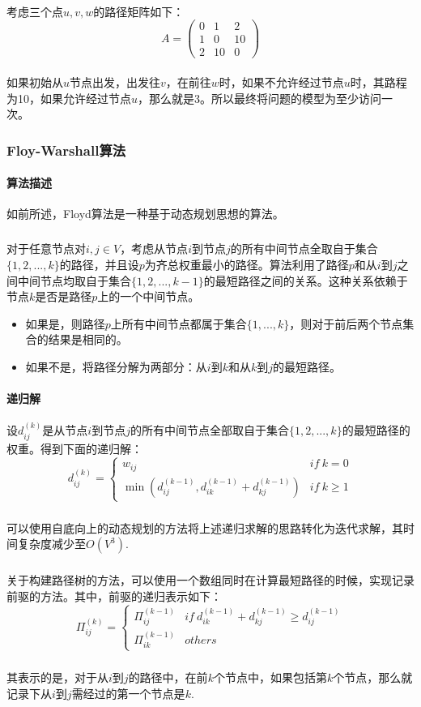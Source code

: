 \documentclass[UTF8,a4paper]{ctexart}
\begin{document}
\paragraph{}考虑三个点$u,v,w$的路径矩阵如下：
\[
    A=\begin{pmatrix}
        0 & 1  & 2  \\
        1 & 0  & 10 \\
        2 & 10 & 0
    \end{pmatrix}
\]
\paragraph{}如果初始从$u$节点出发，出发往$v$，在前往$w$时，如果不允许经过节点$u$时，其路程为10，如果允许经过节点$u$，那么就是3。所以最终将问题的模型为至少访问一次。

\subsubsection{Floy-Warshall算法}\label{sec:floydsolution}
\paragraph{算法描述}如前所述，Floyd算法是一种基于动态规划思想的算法。
\subparagraph{}对于任意节点对$i,j\in V$，考虑从节点$i$到节点$j$的所有中间节点全取自于集合$\{1,2,...,k\}$的路径，并且设$p$为齐总权重最小的路径。算法利用了路径$p$和从$i$到$j$之间中间节点均取自于集合$\{1,2,...,k-1\}$的最短路径之间的关系。这种关系依赖于节点$k$是否是路径$p$上的一个中间节点。
\begin{itemize}
    \item 如果是，则路径$p$上所有中间节点都属于集合$\{1,...,k\}$，则对于前后两个节点集合的结果是相同的。
    \item 如果不是，将路径分解为两部分：从$i$到$k$和从$k$到$j$的最短路径。
\end{itemize}
\paragraph{递归解}设$d_{ij}^{(k)}$是从节点$i$到节点$j$的所有中间节点全部取自于集合$\{1,2,...,k\}$的最短路径的权重。得到下面的递归解：
\[
    d_{ij}^{(k)}=\begin{cases}
        w_{ij}                                             & if~ k=0     \\
        \min(d_{ij}^{(k-1)},d_{ik}^{(k-1)}+d_{kj}^{(k-1)}) & if~ k\geq 1
    \end{cases}
\]
\subparagraph{}可以使用自底向上的动态规划的方法将上述递归求解的思路转化为迭代求解，其时间复杂度减少至$O(V^3)$.
\subparagraph{}关于构建路径树的方法，可以使用一个数组同时在计算最短路径的时候，实现记录前驱的方法。其中，前驱的递归表示如下：
\[
    \Pi_{ij}^{(k)}=\begin{cases}
        \Pi_{ij}^{(k-1)} & if~ d_{ik}^{(k-1)}+d_{kj}^{(k-1)} \geq d_{ij}^{(k-1)} \\
        \Pi_{ik}^{(k-1)} & others
    \end{cases}
\]
\subparagraph{}其表示的是，对于从$i$到$j$的路径中，在前$k$个节点中，如果包括第$k$个节点，那么就记录下从$i$到$j$需经过的第一个节点是$k$.
\end{document}
